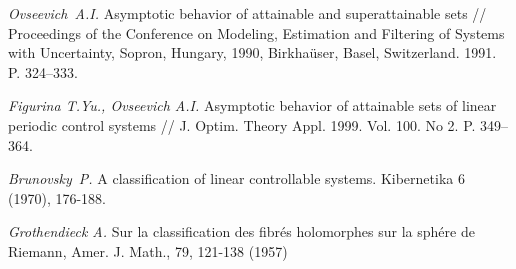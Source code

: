\documentclass[final]{siamltex}
\begin{document}
\begin{thebibliography}{9}

  {\it Ovseevich~A.I.} Asymptotic behavior of attainable and
superattainable sets // Proceedings of the Conference on Modeling, Estimation
and Filtering of Systems with Uncertainty, Sopron, Hungary, 1990,
Birkha\"{u}ser, Basel, Switzerland. 1991. P. 324--333.

 {\it Figurina T.Yu., Ovseevich A.I.}  Asymptotic behavior
of attainable sets of linear periodic control systems
// J. Optim. Theory Appl. 1999. Vol. 100. No 2. P. 349--364.

 {\it Brunovsky~P.} A classification of linear controllable systems. Kibernetika 6 (1970), 176-188.

 {\it Grothendieck A.} Sur la classification des fibr\'es holomorphes sur la sph\'ere de Riemann,  Amer. J. Math., 79, 121-138 (1957)

\end{thebibliography}
\end{document}
